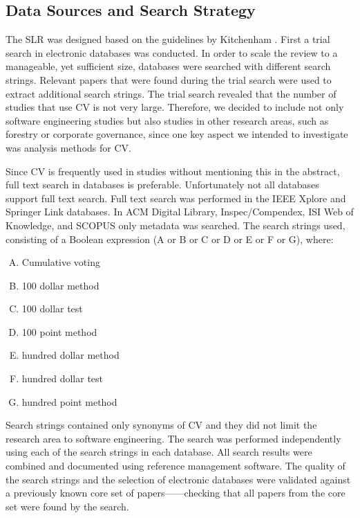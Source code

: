 \subsection{Data Sources and Search Strategy}
The SLR was designed based on the guidelines by Kitchenham \cite{Kitchenham2007}. First a trial search in electronic databases was conducted. In order to scale the review to a manageable, yet sufficient size, databases were searched with different search strings. Relevant papers that were found during the trial search were used to extract additional search strings. The trial search revealed that the number of studies that use CV is not very large. Therefore, we decided to include not only software engineering studies but also studies in other research areas, such as forestry or corporate governance, since one key aspect we intended to investigate was analysis methods for CV.

Since CV is frequently used in studies without mentioning this in the abstract, full text search in databases is preferable. Unfortunately not all databases support full text search. Full text search was performed in the IEEE Xplore and Springer Link databases. In ACM Digital Library, Inspec\slash Compendex, ISI Web of Knowledge, and SCOPUS only metadata was searched.
The search strings used, consisting of a Boolean expression (A or B or C or D or E or F or G), where:

\begin{multicols}{2}
	\begin{enumerate}[(A)]
\item Cumulative voting  
\item 100 dollar method
\item 100 dollar test 
\item 100 point method
\item hundred dollar method
\item hundred dollar test
\item hundred point method
\end{enumerate}
\end{multicols}

Search strings contained only synonyms of CV and they did not limit the research area to software engineering. The search was performed independently using each of the search strings in each database. 
All search results were combined and documented using reference management software. The quality of the search strings and the selection of electronic databases were validated against a previously known core set of papers---\cite{Ahl2005,Chatzipetrou2010,Berander2006,Regnell2001}---checking that all papers from the core set were found by the search.

